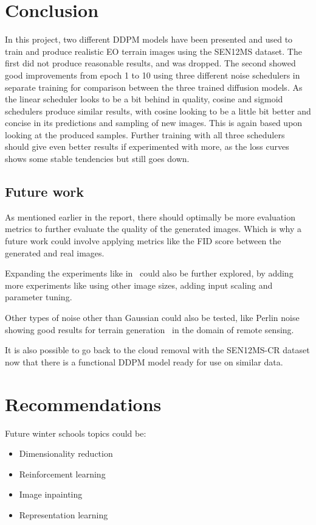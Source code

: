 \documentclass[fullpaper]{nldl}
\begin{document}
\section{Conclusion}
\label{sect:Conclusion}
In this project, two different DDPM models have been presented and used to train and produce realistic EO terrain images using the SEN12MS dataset. The first did not produce reasonable results, and was dropped. The second showed good improvements from epoch 1 to 10 using three different noise schedulers in separate training for comparison between the three trained diffusion models. As the linear scheduler looks to be a bit behind in quality, cosine and sigmoid schedulers produce similar results, with cosine looking to be a little bit better and concise in its predictions and sampling of new images. This is again based upon looking at the produced samples. Further training with all three schedulers should give even better results if experimented with more, as the loss curves shows some stable tendencies but still goes down.


\subsection{Future work}
\label{subsect:Future}
As mentioned earlier in the report, there should optimally be more evaluation metrics to further evaluate the quality of the generated images. Which is why a future work could involve applying metrics like the FID score between the generated and real images.

Expanding the experiments like in~\cite{chen2023importance} could also be further explored, by adding more experiments like using other image sizes, adding input scaling and parameter tuning.

Other types of noise other than Gaussian could also be tested, like Perlin noise showing good results for terrain generation~\cite{jain2023Perlin} in the domain of remote sensing.

It is also possible to go back to the cloud removal with the SEN12MS-CR dataset now that there is a functional DDPM model ready for use on similar data.


\section*{Recommendations}
Future winter schools topics could be:
\begin{itemize}
	\item Dimensionality reduction
	\item Reinforcement learning
	\item Image inpainting
	\item Representation learning
\end{itemize}

\printbibliography

\end{document}
